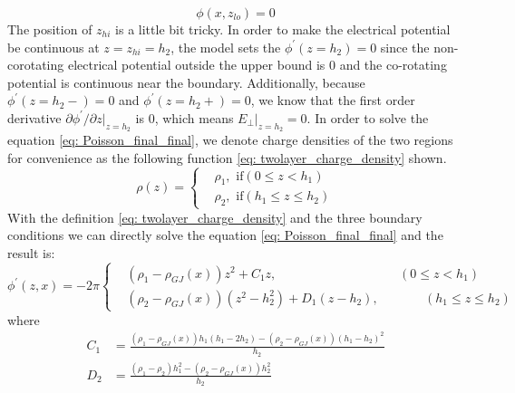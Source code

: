 \documentclass[12pt]{report}
\begin{document}
      \begin{equation}
        \label{eq: lower_boundary}
        \phi \left(x, z_{lo}\right) = 0
      \end{equation}
      The position of $z_{hi}$ is a little bit tricky. In order to make the electrical potential be 
      continuous at $z = z_{hi} = h_2$, the model sets the $\phi^{\prime}\left(z=h_{2}\right) = 0$ since the 
      non-corotating electrical potential outside the upper bound is $0$ and the co-rotating potential
      is continuous near the boundary. Additionally, because $\phi^{\prime}\left(z=h_{2}-\right) = 0$
      and $\phi^{\prime}\left(z=h_{2}+\right) = 0$, we know that the first order derivative 
      $\partial{\phi^{\prime}}/\partial{z}\vert_{z=h_{2}}$ is $0$, which means 
      $E_{\perp}\vert_{z=h_{2}} = 0$. 
      In order to solve the equation \ref{eq: Poisson_final_final}, we denote charge densities of
      the two regions for convenience as the following function 
      \ref{eq: twolayer_charge_density} shown.
      \begin{equation}
        \label{eq: twolayer_charge_density}
          \rho\left(z\right) = 
          \begin{cases}
             & \rho_{1} , \text{    if} \left(0 \leq z < h_{1}\right)\\
             & \rho_{2} , \text{    if} \left(h_{1} \leq z \leq h_{2}\right) 
          \end{cases}       
      \end{equation}
      With the definition \ref{eq: twolayer_charge_density} and the three boundary conditions
      we can directly solve the equation \ref{eq: Poisson_final_final} and the result is:
      \begin{equation}
        \label{eq: twolayer_potential}
          \phi^{\prime}\left(z, x\right) = -2\pi
          \left\{\begin{alignedat}{2}
             & \left(\rho_{1} - \rho_{GJ}\left(x\right)\right)z^2 + C_{1} z ,  &&\left(0 \leq z < h_{1}\right)\\
             & \left(\rho_{2}-\rho_{GJ}\left(x\right)\right)\left(z^2 - h_2^2\right) + D_{1} \left(z-h_2\right),  &&\qquad \left(h_{1} \leq z \leq h_{2}\right) 
          \end{alignedat}\right.
      \end{equation}
      where 
      \begin{align*}
        C_{1} &= \frac{\left(\rho_{1}-\rho_{GJ}\left(x\right)\right)h_1\left(h_1-2h_2\right)-\left(\rho_2-\rho_{GJ}\left(x\right)\right)\left(h_1-h_2\right)^2}{h_2} \\
        D_{2} &= \frac{\left(\rho_1-\rho_2\right)h_1^2-\left(\rho_2-\rho_{GJ}\left(x\right)\right)h_2^2}{h_2}
      \end{align*}
\end{document}
